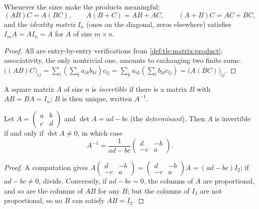 \begin{proposition}\label{prop:tle:matrix:rules}
Whenever the sizes make the products meaningful:
\[
(AB)C = A(BC), \qquad A(B + C) = AB + AC, \qquad (A+B)C = AC + BC,
\]
and the \emph{identity matrix} $I_n$ (ones on the diagonal, zeros elsewhere)
satisfies $I_m A = A I_n = A$ for $A$ of size $m \times n$.
\end{proposition}

\begin{proof}
All are entry-by-entry verifications from
\cref{def:tle:matrix:product}; associativity, the only nontrivial one,
amounts to exchanging two finite sums:
$\bigl((AB)C\bigr)_{ij} = \sum_l \left(\sum_k a_{ik}b_{kl}\right) c_{lj}
= \sum_k a_{ik} \left(\sum_l b_{kl} c_{lj}\right)
= \bigl(A(BC)\bigr)_{ij}$.
\end{proof}

\begin{definition}[Inverse]\label{def:tle:matrix:inverse}
A square matrix $A$ of size $n$ is \emph{invertible}
if there is a matrix $B$ with $AB = BA = I_n$; $B$ is then unique, written
$A^{-1}$.
\end{definition}

\begin{proposition}\label{prop:tle:matrix:inverse2x2}
Let $A = \begin{pmatrix} a & b\\ c & d\end{pmatrix}$ and
$\det A = ad - bc$ (the \emph{determinant}). Then $A$ is
invertible if and only if $\det A \neq 0$, in which case
\[
A^{-1} = \frac{1}{ad - bc}\begin{pmatrix} d & -b\\ -c & a\end{pmatrix}.
\]
\end{proposition}

\begin{proof}
A computation gives
$A \begin{pmatrix} d & -b\\ -c & a\end{pmatrix}
= \begin{pmatrix} d & -b\\ -c & a\end{pmatrix} A = (ad - bc) I_2$; if
$ad - bc \neq 0$, divide. Conversely, if $ad - bc = 0$, the columns of $A$
are proportional, and so are the columns of $AB$ for any $B$; but the
columns of $I_2$ are not proportional, so no $B$ can satisfy $AB = I_2$.
\end{proof}

